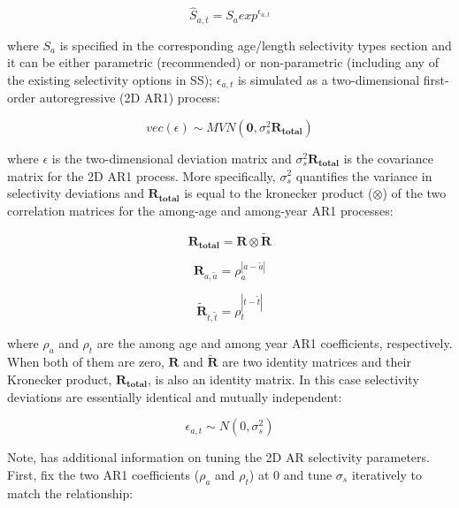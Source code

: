 \begin{equation}
\hat{S}_{a,t} = S_aexp^{\epsilon_{a,t}}
\end{equation}

where $S_a$ is specified in the corresponding age/length selectivity types section and it can be either parametric (recommended) or non-parametric (including any of the existing selectivity options in SS); $\epsilon_{a,t}$ is simulated as a two-dimensional first-order autoregressive (2D AR1) process:

\begin{equation}
vec(\epsilon) \sim MVN(\mathbf{0},\sigma_s^2\mathbf{R_{total}})
\end{equation}

where $\epsilon$ is the two-dimensional deviation matrix and $\sigma_s^2\mathbf{R_{total}}$ is the covariance matrix for the 2D AR1 process. More specifically, $\sigma_s^2$ quantifies the variance in selectivity deviations and $\mathbf{R_{total}}$ is equal to the kronecker product ($\otimes$) of the two correlation matrices for the among-age and among-year AR1 processes:

\begin{equation}
\mathbf{R_{total}}=\mathbf{R}\otimes\mathbf{\tilde{R}}
\end{equation}

\begin{equation}
\mathbf{R}_{a,\tilde{a}}=\rho_a^{|a-\tilde{a}|}
\end{equation}

\begin{equation}
\mathbf{\tilde{R}}_{t,\tilde{t}}=\rho_t^{|t-\tilde{t}|}
\end{equation}

where $\rho_a$ and $\rho_t$ are the among age and among year AR1 coefficients, respectively. When both of them are zero, $\mathbf{R}$ and $\mathbf{\tilde{R}}$ are two identity matrices and their Kronecker product, $\mathbf{R_{total}}$, is also an identity matrix. In this case selectivity deviations are essentially identical and mutually independent:

\begin{equation}
\epsilon_{a,t}\sim N(0,\sigma_s^2)
\end{equation} 

Note, \citet{xu_new_2019} has additional information on tuning the 2D AR selectivity parameters. First, fix the two AR1 coefficients ($\rho_a$ and $\rho_t$) at 0 and tune $\sigma_s$ iteratively to match the relationship:

